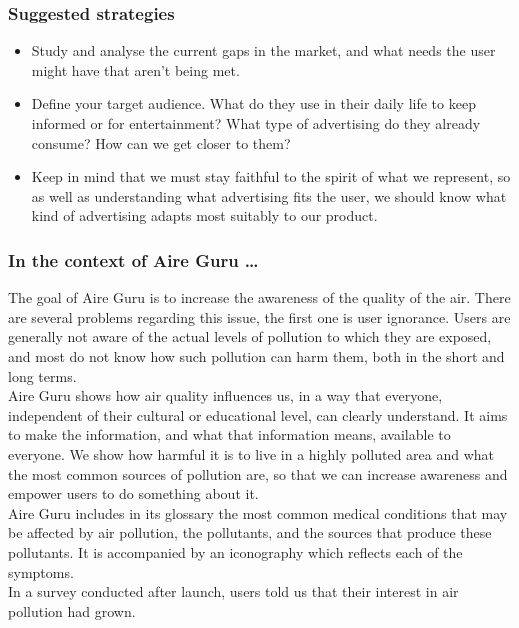 \subsubsection*{Suggested strategies}

\begin{itemize}
    \item Study and analyse the current gaps in the market, and what needs the user might have that aren't being met.
    \item Define your target audience. What do they use in their daily life to keep informed or for entertainment?
    What type of advertising do they already consume? How can we get closer to them?
    \item Keep in mind that we must stay faithful to the spirit of what we represent, so as well as understanding what advertising fits the user,
    we should know what kind of advertising adapts most suitably to our product.
\end{itemize}

\subsubsection*{In the context of Aire Guru \ldots}

The goal of Aire Guru is to increase the awareness of the quality of the air.
There are several problems regarding this issue, the first one is user ignorance.
Users are generally not aware of the actual levels of pollution to which they are exposed, and most do not know how such pollution can harm them,
both in the short and long terms.\\

Aire Guru shows how air quality influences us, in a way that everyone, independent of their cultural or educational level, can clearly understand.
It aims to make the information, and what that information means, available to everyone.
We show how harmful it is to live in a highly polluted area and what the most common sources of pollution
are, so that we can increase awareness and empower users to do something about it.\\

Aire Guru includes in its glossary the most common medical conditions that may be affected by air pollution, the pollutants, and the sources that produce these pollutants.
It is accompanied by an iconography which reflects each of the symptoms. \\

In a survey conducted after launch, users told us that their interest in air pollution had grown.\\

